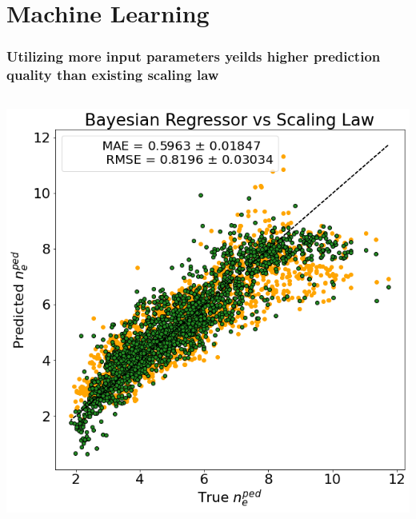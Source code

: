 \documentclass{beamer}
\begin{document}
\section{Machine Learning}
\begin{frame}
\frametitle{Utilizing more input parameters yeilds higher prediction quality than existing scaling law}
\begin{block}{}
\begin{columns}

\includegraphics[scale=0.25]{./src/Baysian_regression_predictions}


\end{columns}
\end{block}
\end{frame}
\end{document}
